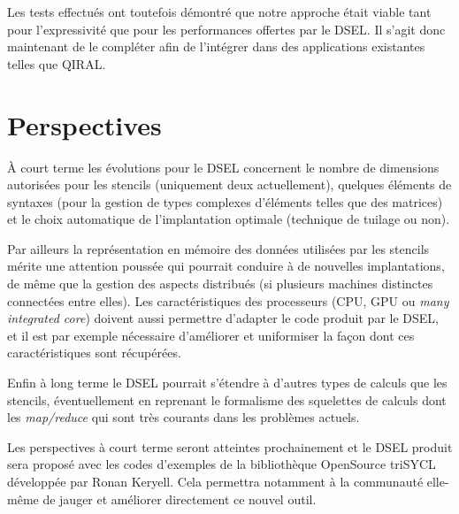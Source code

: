 Les tests effectués ont toutefois démontré que notre approche était viable tant pour l'expressivité que pour les performances offertes par le DSEL. Il s'agit donc maintenant de le compléter afin de l'intégrer dans des applications existantes telles que \textsf{QIRAL}.

\section{Perspectives}

À court terme les évolutions pour le DSEL concernent le nombre de dimensions autorisées pour les stencils (uniquement deux actuellement), quelques éléments de syntaxes (pour la gestion de types complexes d'éléments telles que des matrices) et le choix automatique de l'implantation optimale (technique de tuilage ou non).

Par ailleurs la représentation en mémoire des données utilisées par les stencils mérite une attention poussée qui pourrait conduire à de nouvelles implantations, de même que la gestion des aspects distribués (si plusieurs machines distinctes connectées entre elles). Les caractéristiques des  processeurs (CPU, GPU ou \emph{many integrated core}) doivent aussi permettre d'adapter le code produit par le DSEL, et il est par exemple nécessaire d'améliorer et uniformiser la façon dont ces caractéristiques sont récupérées.

Enfin à long terme le DSEL pourrait s'étendre à d'autres types de calculs que les stencils, éventuellement en reprenant le formalisme des squelettes de calculs dont les \emph{map/reduce} qui sont très courants dans les problèmes actuels.

Les perspectives à court terme seront atteintes prochainement et le DSEL produit sera proposé avec les codes d'exemples de la bibliothèque OpenSource \textsf{triSYCL} développée par Ronan Keryell. Cela permettra notamment à la communauté elle-même de jauger et améliorer directement ce nouvel outil. 

